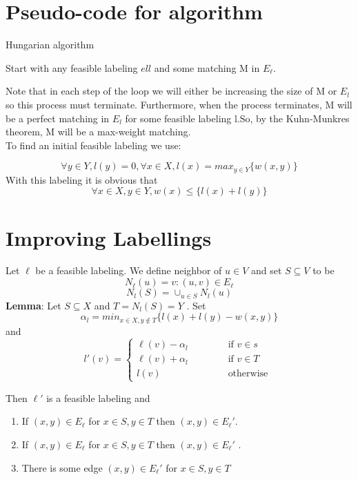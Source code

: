 \documentclass[a4paper]{report}
\theoremstyle{definition}
\begin{document}
\section{Pseudo-code for algorithm}
\begin{algorithm}
\caption{Hungarian algorithm}
Start with any feasible labeling $ell$ and some matching M in $E_\ell$.\\
 \end{algorithm}
Note that in each step of the loop we will either be
increasing the size of M or $E_l$ so this process must
terminate. 
Furthermore, when the process terminates, M will be a perfect matching in $E_l$ for some feasible labeling l.So, by the Kuhn-Munkres theorem, M will be a max-weight matching.\\ \newline
To find an initial feasible labeling we use:

$$ \forall y \in Y, l(y) = 0,\forall x \in X, l(x) = max_{y \in Y} \{w(x, y)\}$$
With this labeling it is obvious that
$$ \forall x \in X, y \in Y, w(x) \leq \{l(x) + l(y)\}$$

\section{Improving Labellings}

Let $\ell$ be a feasible labeling.
We define neighbor of $u \in V$ and set $S \subseteq V$ to be
$$N_\ell (u) = {v : (u, v) \in E_\ell }$$
$$N_l (S) = \cup _{u\in S} N_l (u)$$
\textbf{Lemma}: Let $S \subseteq X$ and $T = N_l (S) = Y$ . Set $$\alpha_l =min_{x\in X,y \notin T} \{l(x) + l(y) - w(x, y)\}$$ and
\begin{equation*}
l'(v)=
\left\{ \begin{array}{ll}
\ell(v)-\alpha_l  \qquad \quad   & \mbox{ if } v\in s\\
\ell(v)+\alpha_l    &  \mbox{ if }v\in T\\
l(v)              &  \mbox{ otherwise }
\end{array}\right.
\end{equation*}

Then $\ell'$ is a feasible labeling and
\begin{enumerate}
\item If $(x, y) \in E_\ell$ for $x \in S, y \in T$ then $(x, y) \in E_\ell' $.
\item If $(x, y) \in E_\ell$ for $x \in S, y \in T$ then $(x, y) \in E_\ell'$ .
\item There is some edge $(x, y) \in E_\ell'$ for $x \in S, y \in T$
\end{enumerate}
\end{document}
